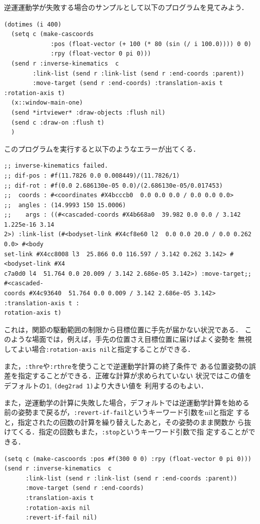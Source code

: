 逆運運動学が失敗する場合のサンプルとして以下のプログラムを見てみよう．
{\baselineskip=10pt
\begin{verbatim}
(dotimes (i 400)
  (setq c (make-cascoords
             :pos (float-vector (+ 100 (* 80 (sin (/ i 100.0)))) 0 0)
             :rpy (float-vector 0 pi 0)))
  (send r :inverse-kinematics  c
        :link-list (send r :link-list (send r :end-coords :parent))
        :move-target (send r :end-coords) :translation-axis t  :rotation-axis t)
  (x::window-main-one)
  (send *irtviewer* :draw-objects :flush nil)
  (send c :draw-on :flush t)
  )
\end{verbatim}
}

このプログラムを実行すると以下のようなエラーが出てくる．
{\baselineskip=10pt
\begin{verbatim}
;; inverse-kinematics failed.
;; dif-pos : #f(11.7826 0.0 0.008449)/(11.7826/1)
;; dif-rot : #f(0.0 2.686130e-05 0.0)/(2.686130e-05/0.017453)
;;  coords : #<coordinates #X4bcccb0  0.0 0.0 0.0 / 0.0 0.0 0.0>
;;  angles : (14.9993 150 15.0006)
;;    args : ((#<cascaded-coords #X4b668a0  39.982 0.0 0.0 / 3.142 1.225e-16 3.14
2>) :link-list (#<bodyset-link #X4cf8e60 l2  0.0 0.0 20.0 / 0.0 0.262 0.0> #<body
set-link #X4cc8008 l3  25.866 0.0 116.597 / 3.142 0.262 3.142> #<bodyset-link #X4
c7a0d0 l4  51.764 0.0 20.009 / 3.142 2.686e-05 3.142>) :move-target;; #<cascaded-
coords #X4c93640  51.764 0.0 0.009 / 3.142 2.686e-05 3.142> :translation-axis t :
rotation-axis t)
\end{verbatim}
}

これは，関節の駆動範囲の制限から目標位置に手先が届かない状況である．
このような場面では，例えば，手先の位置さえ目標位置に届けばよく姿勢を
無視してよい場合\verb|:rotation-axis nil|と指定することができる．

また，\verb|:thre|や\verb|:rthre|を使うことで逆運動学計算の終了条件で
ある位置姿勢の誤差を指定することができる．正確な計算が求められていない
状況ではこの値をデフォルトの\verb|1|, \verb|(deg2rad 1)|より大きい値を
利用するのもよい．

また，逆運動学の計算に失敗した場合，デフォルトでは逆運動学計算を始める
前の姿勢まで戻るが，\verb|:revert-if-fail|というキーワード引数をnilと指定
すると，指定されたの回数の計算を繰り替えしたあと，その姿勢のまま関数か
ら抜けてくる．指定の回数もまた，\verb|:stop|というキーワード引数で指
定することができる．

{\baselineskip=10pt
\begin{verbatim}
(setq c (make-cascoords :pos #f(300 0 0) :rpy (float-vector 0 pi 0)))
(send r :inverse-kinematics  c
      :link-list (send r :link-list (send r :end-coords :parent))
      :move-target (send r :end-coords)
      :translation-axis t
      :rotation-axis nil
      :revert-if-fail nil)
\end{verbatim}
}

